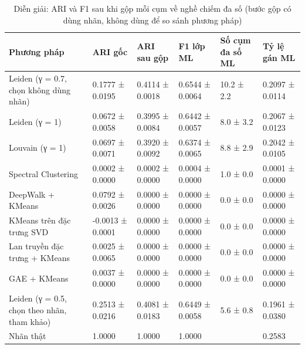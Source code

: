 \begin{table}[htbp]
\caption{Diễn giải: ARI và F1 sau khi gộp mỗi cụm về nghề chiếm đa số (bước gộp có dùng nhãn, không dùng để so sánh phương pháp)}
\label{tab:rq2_merge}
\begin{tabular}{llllll}
\toprule
Phương pháp & ARI gốc & ARI sau gộp & F1 lớp ML & Số cụm đa số ML & Tỷ lệ gán ML \\
\midrule
Leiden (γ = 0.7, chọn không dùng nhãn) & 0.1777 ± 0.0195 & 0.4114 ± 0.0018 & 0.6544 ± 0.0064 & 10.2 ± 2.2 & 0.2097 ± 0.0114 \\
Leiden (γ = 1) & 0.0672 ± 0.0058 & 0.3995 ± 0.0084 & 0.6442 ± 0.0057 & 8.0 ± 3.2 & 0.2067 ± 0.0123 \\
Louvain (γ = 1) & 0.0697 ± 0.0071 & 0.3920 ± 0.0092 & 0.6374 ± 0.0065 & 8.8 ± 2.9 & 0.2042 ± 0.0105 \\
Spectral Clustering & 0.0002 ± 0.0000 & 0.0002 ± 0.0000 & 0.0004 ± 0.0000 & 1.0 ± 0.0 & 0.0001 ± 0.0000 \\
DeepWalk + KMeans & 0.0792 ± 0.0026 & 0.0000 ± 0.0000 & 0.0000 ± 0.0000 & 0.0 ± 0.0 & 0.0000 ± 0.0000 \\
KMeans trên đặc trưng SVD & -0.0013 ± 0.0001 & 0.0000 ± 0.0000 & 0.0000 ± 0.0000 & 0.0 ± 0.0 & 0.0000 ± 0.0000 \\
Lan truyền đặc trưng + KMeans & 0.0025 ± 0.0065 & 0.0000 ± 0.0000 & 0.0000 ± 0.0000 & 0.0 ± 0.0 & 0.0000 ± 0.0000 \\
GAE + KMeans & 0.0037 ± 0.0000 & 0.0000 ± 0.0000 & 0.0000 ± 0.0000 & 0.0 ± 0.0 & 0.0000 ± 0.0000 \\
Leiden (γ = 0.5, chọn theo nhãn, tham khảo) & 0.2513 ± 0.0216 & 0.4081 ± 0.0183 & 0.6449 ± 0.0058 & 5.6 ± 0.8 & 0.1961 ± 0.0380 \\
Nhãn thật & 1.0000 & 1.0000 & 1.0000 &  & 0.2583 \\
\bottomrule
\end{tabular}
\end{table}
